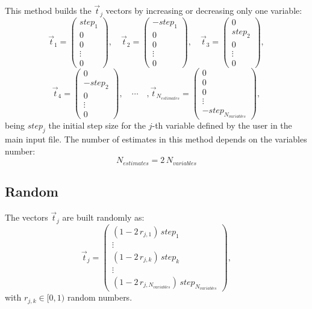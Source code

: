 \documentclass[a4paper]{report}
\newcommand{\EQ}[2]
{\begin{equation}#1\label{#2}\end{equation}}
\newcommand{\MATRIX}[2]{\PA{\begin{array}{#1}#2\end{array}}}
\newcommand{\PA}[1]{\left(#1\right)}
\begin{document}
This method builds the $\vec{t}_j$ vectors by increasing or decreasing only one
variable:
\[
	\vec{t}_1=\MATRIX{c}{step_1\\0\\0\\\vdots\\0},\quad
	\vec{t}_2=\MATRIX{c}{-step_1\\0\\0\\\vdots\\0},\quad
	\vec{t}_3=\MATRIX{c}{0\\step_2\\0\\\vdots\\0},
\]
\EQ
{
	\vec{t}_4=\MATRIX{c}{0\\-step_2\\0\\\vdots\\0},\quad\cdots\quad,
	\vec{t}_{N_{estimates}}=\MATRIX{c}{0\\0\\0\\\vdots\\
	-step_{N_{variables}}},
}{EqtDescent}
being $step_j$ the initial step size for the $j$-th variable defined by the user
in the main input file. The number of estimates in this method depends on the
variables number:
\EQ{N_{estimates}=2\,N_{variables}}{EqNestimatesDescent}

\subsection{Random}

The vectors $\vec{t}_j$ are built randomly as:
\EQ
{
	\vec{t}_j=\MATRIX{c}{\PA{1-2\,r_{j,1}}\,step_1\\\vdots\\
	\PA{1-2\,r_{j,k}}\,step_k\\\vdots\\
	\PA{1-2\,r_{j,N_{variables}}}\,step_{N_{variables}}},
}{EqtRandom}
with $r_{j,k}\in[0,1)$ random numbers.
\end{document}

